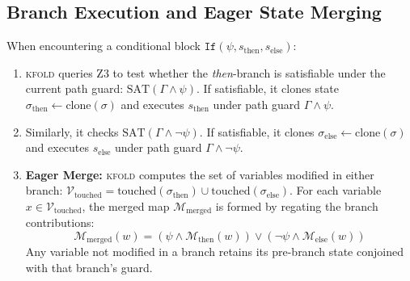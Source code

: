 \documentclass[acmsmall,screen,review]{acmart}
\newcommand{\tool}{\textsc{kfold}\xspace}
\begin{document}
\subsection{Branch Execution and Eager State Merging}
\label{sec:semantics:merge}

When encountering a conditional block $\mathtt{If}(\psi, s_{\text{then}}, s_{\text{else}})$:

\begin{enumerate}
\item \tool queries Z3 to test whether the \emph{then}-branch is satisfiable under the current path guard: $\text{SAT}(\Gamma \wedge \psi)$. If satisfiable, it clones state $\sigma_{\text{then}} \gets \text{clone}(\sigma)$ and executes $s_{\text{then}}$ under path guard $\Gamma \wedge \psi$.
\item Similarly, it checks $\text{SAT}(\Gamma \wedge \neg \psi)$. If satisfiable, it clones $\sigma_{\text{else}} \gets \text{clone}(\sigma)$ and executes $s_{\text{else}}$ under path guard $\Gamma \wedge \neg \psi$.
\item \textbf{Eager Merge:} \tool computes the set of variables modified in either branch: $\mathcal{V}_{\text{touched}} = \text{touched}(\sigma_{\text{then}}) \cup \text{touched}(\sigma_{\text{else}})$.
For each variable $x \in \mathcal{V}_{\text{touched}}$, the merged map $\mathcal{M}_{\text{merged}}$ is formed by regating the branch contributions:
$$\mathcal{M}_{\text{merged}}(w) = \left( \psi \wedge \mathcal{M}_{\text{then}}(w) \right) \vee \left( \neg \psi \wedge \mathcal{M}_{\text{else}}(w) \right)$$
Any variable not modified in a branch retains its pre-branch state conjoined with that branch's guard.
\end{enumerate}
\end{document}
